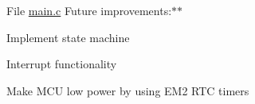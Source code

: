 
\begin{DoxyRefList}
\item[File \mbox{\hyperlink{main_8c}{main.c}} ]\label{todo__todo000001}%
%
 Future improvements\+:$\ast$$\ast$~\newline

\begin{DoxyItemize}
\item Implement state machine
\item Interrupt functionality
\item Make M\+CU low power by using E\+M2 R\+TC timers
\end{DoxyItemize}
\end{DoxyRefList}